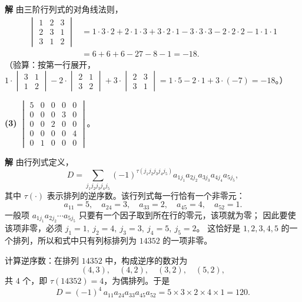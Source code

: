 \documentclass[11pt,a4paper]{ctexart}
\newenvironment{solution}
  {\par\noindent\textbf{解}\quad}
  {\par}
\begin{document}
\begin{solution}
由三阶行列式的对角线法则，
\[
\begin{aligned}
\begin{vmatrix}1&2&3\\2&3&1\\3&1&2\end{vmatrix}
&=1\cdot3\cdot2+2\cdot1\cdot3+3\cdot2\cdot1-3\cdot3\cdot3-2\cdot2\cdot2-1\cdot1\cdot1\\
&=6+6+6-27-8-1=-18.
\end{aligned}
\]
（验算：按第一行展开，
$1\cdot\begin{vmatrix}3&1\\1&2\end{vmatrix}
-2\cdot\begin{vmatrix}2&1\\3&2\end{vmatrix}
+3\cdot\begin{vmatrix}2&3\\3&1\end{vmatrix}
=1\cdot5-2\cdot1+3\cdot(-7)=-18$。）
\end{solution}

\textbf{(3)} $\begin{vmatrix}5&0&0&0&0\\0&0&0&3&0\\0&0&2&0&0\\0&0&0&0&4\\0&1&0&0&0\end{vmatrix}$。

\begin{solution}
由行列式定义，
\[
D=\sum_{j_1j_2j_3j_4j_5}(-1)^{\tau(j_1j_2j_3j_4j_5)}a_{1j_1}a_{2j_2}a_{3j_3}a_{4j_4}a_{5j_5},
\]
其中 $\tau(\cdot)$ 表示排列的逆序数。该行列式每一行恰有一个非零元：
\[
a_{11}=5,\quad a_{24}=3,\quad a_{33}=2,\quad a_{45}=4,\quad a_{52}=1.
\]
一般项 $a_{1j_1}a_{2j_2}\cdots a_{5j_5}$ 只要有一个因子取到所在行的零元，该项就为零；
因此要使该项非零，必须 $j_1=1,\ j_2=4,\ j_3=3,\ j_4=5,\ j_5=2$。
这恰好是 $1,2,3,4,5$ 的一个排列，所以和式中只有列标排列为 $14352$ 的一项非零。

计算逆序数：在排列 $14352$ 中，构成逆序的数对为
\[
(4,3),\quad(4,2),\quad(3,2),\quad(5,2),
\]
共 $4$ 个，即 $\tau(14352)=4$，为偶排列。于是
\[
D=(-1)^{4}\,a_{11}a_{24}a_{33}a_{45}a_{52}=5\times3\times2\times4\times1=120.
\]
\end{solution}
\end{document}
